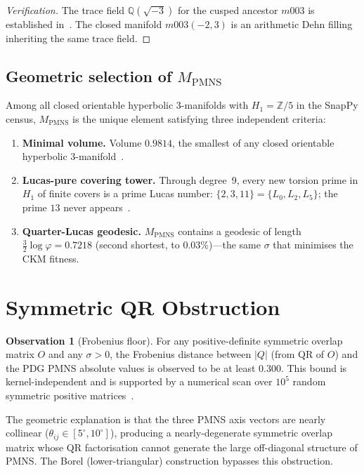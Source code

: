 \documentclass[11pt,a4paper]{article}
\theoremstyle{definition}
\newtheorem{observation}[theorem]{Observation}
\newcommand{\MPMNS}{M_{\mathrm{PMNS}}}
\newcommand{\Zfive}{\mathbb{Z}/5}
\begin{document}
\begin{proof}[Verification]
The trace field $\mathbb{Q}(\sqrt{-3})$ for the cusped ancestor
$m003$ is established in~\cite{Chinburg98}.
The closed manifold $m003(-2,3)$ is an arithmetic Dehn filling
inheriting the same trace field.
\end{proof}

\subsection{Geometric selection of $\MPMNS$}

Among all closed orientable hyperbolic 3-manifolds with $H_1=\Zfive$
in the SnapPy census, $\MPMNS$ is the unique element satisfying three
independent criteria:
\begin{enumerate}[(1)]
\item \textbf{Minimal volume.} Volume $0.9814$, the smallest of any
  closed orientable hyperbolic 3-manifold~\cite{GMM}.
\item \textbf{Lucas-pure covering tower.} Through degree~9, every new
  torsion prime in $H_1$ of finite covers is a prime Lucas number:
  $\{2,3,11\}=\{L_0,L_2,L_5\}$;
  the prime $13$ never appears~\cite{Gentry:Lucas,Gentry:Covering}.
\item \textbf{Quarter-Lucas geodesic.} $\MPMNS$ contains a geodesic
  of length $\frac{3}{2}\log\varphi=0.7218$ (second shortest, to
  $0.03\%$)---the same $\sigma$ that minimises the CKM fitness.
\end{enumerate}

\section{Symmetric QR Obstruction}
\label{sec:obstruction}

\begin{observation}[Frobenius floor]
\label{obs:floor}
For any positive-definite symmetric overlap matrix $O$ and any
$\sigma>0$, the Frobenius distance between $|Q|$ (from QR of $O$)
and the PDG PMNS absolute values is observed to be at least $0.300$.
This bound is kernel-independent and is supported by a numerical
scan over $10^5$ random symmetric positive matrices~\cite{Gentry:PMNS_arxiv}.
\end{observation}

The geometric explanation is that the three PMNS axis vectors are
nearly collinear ($\theta_{ij}\in[5^\circ,10^\circ]$), producing
a nearly-degenerate symmetric overlap matrix whose QR factorisation
cannot generate the large off-diagonal structure of PMNS.
The Borel (lower-triangular) construction bypasses this obstruction.
\end{document}
